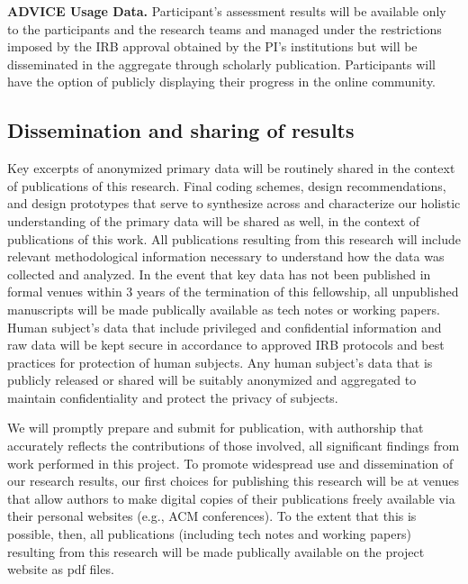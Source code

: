 \textbf{ADVICE Usage Data.} 
Participant’s assessment results will be available only to the participants and the research teams and managed under the restrictions imposed by the IRB approval obtained by the PI’s institutions but will be disseminated in the aggregate through scholarly publication. Participants will have the option of publicly displaying their progress in the online community. 

\subsection{Dissemination and sharing of results}
Key excerpts of anonymized primary data will be routinely shared in the context of publications of this research. Final coding schemes, design recommendations, and design prototypes that serve to synthesize across and characterize our holistic understanding of the primary data will be shared as well, in the context of publications of this work. All publications resulting from this research will include relevant methodological information necessary to understand how the data was collected and analyzed. In the event that key data has not been published in formal venues within 3 years of the termination of this fellowship, all unpublished manuscripts will be made publically available as tech notes or working papers. Human subject’s data that include privileged and confidential information and raw data will be kept secure in accordance to approved IRB protocols and best practices for protection of human subjects. Any human subject’s data that is publicly released or shared will be suitably anonymized and aggregated to maintain confidentiality and protect the privacy of subjects.

We will promptly prepare and submit for publication, with authorship that accurately reflects the contributions of those involved, all significant findings from work performed in this project. To promote widespread use and dissemination of our research results, our first choices for publishing this research will be at venues that allow authors to make digital copies of their publications freely available via their personal websites (e.g., ACM conferences). To the extent that this is possible, then, all publications (including tech notes and working papers) resulting from this research will be made publically available on the project website as pdf files. 

